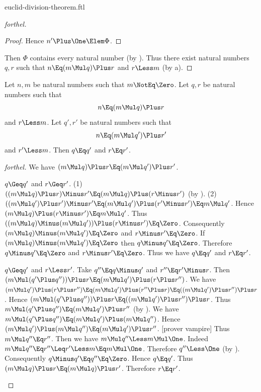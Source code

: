 \documentclass{stex}
\begin{document}
\begin{smodule}{euclid-division-theorem.ftl}
\begin{proof}[forthel]
\begin{proof}
    Hence $n' \Plus \One \Elem \Phi$.
  \end{proof}

  Then $\Phi$ contains every natural number (by ).
  Thus there exist natural numbers $q, r$ such that $n \Eq (m \Mul q) \Plus r$ and $r \Less m$ (by a).
\end{proof}

\begin{theorem*}[forthel,title=Euclid's Division Theorem: Uniqueness,name=Euclid Division Uniqueness]
  Let $n, m$ be natural numbers such that $m \NotEq \Zero$.
  Let $q, r$ be natural numbers such that
  \[n \Eq (m \Mul q) \Plus r\]
  and $r \Less m$.
  Let $q', r'$ be natural numbers such that
  \[n \Eq (m \Mul q') \Plus r'\]
  and $r' \Less m$.
  Then $q \Eq q'$ and $r \Eq r'$.
\end{theorem*}
\begin{proof}[forthel]
  We have $(m \Mul q) \Plus r \Eq (m \Mul q') \Plus r'$.

  \begin{case}{$q \Geq q'$ and $r \Geq r'$.}
    (1) $((m \Mul q) \Plus r) \Minus r' \Eq (m \Mul q) \Plus (r \Minus r')$ (by ).
    (2) $((m \Mul q') \Plus r') \Minus r'
      \Eq (m \Mul q') \Plus (r' \Minus r')
      \Eq m \Mul q'$.
    Hence $(m \Mul q) \Plus (r \Minus r') \Eq m \Mul q'$.
    Thus $((m \Mul q) \Minus (m \Mul q')) \Plus (r \Minus r') \Eq \Zero$.
    Consequently $(m \Mul q) \Minus (m \Mul q') \Eq \Zero$ and $r \Minus r' \Eq \Zero$.
    If $(m \Mul q) \Minus (m \Mul q') \Eq \Zero$ then $q \Minus q' \Eq \Zero$.
    Therefore $q \Minus q' \Eq \Zero$ and $r \Minus r' \Eq \Zero$.
    Thus we have $q \Eq q'$ and $r \Eq r'$.
  \end{case}

  \begin{case}{$q \Geq q'$ and $r \Less r'$.}
    Take $q'' \Eq q \Minus q'$ and $r'' \Eq r' \Minus r$.
    Then $(m \Mul (q' \Plus q'')) \Plus r \Eq (m \Mul q') \Plus (r \Plus r'')$.
    We have $(m \Mul q') \Plus (r \Plus r'')
      \Eq (m \Mul q') \Plus (r'' \Plus r)
      \Eq ((m \Mul q') \Plus r'') \Plus r$.
    Hence $(m \Mul (q' \Plus q'')) \Plus r \Eq ((m \Mul q') \Plus r'') \Plus r$.
    Thus $m \Mul (q' \Plus q'') \Eq (m \Mul q') \Plus r''$ (by ).
    We have $m \Mul (q' \Plus q'') \Eq (m \Mul q') \Plus (m \Mul q'')$.
    Hence $(m \Mul q') \Plus (m \Mul q'') \Eq (m \Mul q') \Plus r''$.
    [prover vampire]
    Thus $m \Mul q'' \Eq r''$.
    Then we have $m \Mul q'' \Less m \Mul \One$.
    Indeed $m \Mul q''
      \Eq r''
      \Leq r'
      \Less m
      \Eq m \Mul \One$.
    Therefore $q'' \Less \One$ (by ).
    Consequently $q \Minus q' \Eq q'' \Eq \Zero$.
    Hence $q \Eq q'$.
    Thus $(m \Mul q) \Plus r \Eq (m \Mul q) \Plus r'$.
    Therefore $r \Eq r'$.
  \end{case}


\end{proof}
\end{smodule}
\end{document}
